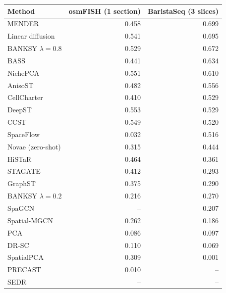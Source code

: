 \begin{tabular}{lrr}\toprule
Method & osmFISH (1 section) & BaristaSeq (3 slices) \\\midrule
MENDER & 0.458 & 0.699 \\
Linear diffusion & 0.541 & 0.695 \\
BANKSY $\lambda=0.8$ & 0.529 & 0.672 \\
BASS & 0.441 & 0.634 \\
NichePCA & 0.551 & 0.610 \\
AnisoST & 0.482 & 0.556 \\
CellCharter & 0.410 & 0.529 \\
DeepST & 0.553 & 0.529 \\
CCST & 0.549 & 0.520 \\
SpaceFlow & 0.032 & 0.516 \\
Novae (zero-shot) & 0.315 & 0.444 \\
HiSTaR & 0.464 & 0.361 \\
STAGATE & 0.412 & 0.293 \\
GraphST & 0.375 & 0.290 \\
BANKSY $\lambda=0.2$ & 0.216 & 0.270 \\
SpaGCN & -- & 0.207 \\
Spatial-MGCN & 0.262 & 0.186 \\
PCA & 0.086 & 0.097 \\
DR-SC & 0.110 & 0.069 \\
SpatialPCA & 0.309 & 0.001 \\
PRECAST & 0.010 & -- \\
SEDR & -- & -- \\
\bottomrule\end{tabular}
